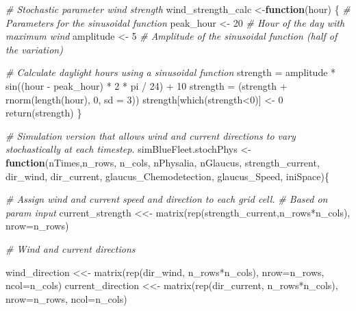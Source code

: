 \documentclass[
]{article}
\newenvironment{Shaded}{\begin{snugshade}}{\end{snugshade}}
\newcommand{\AttributeTok}[1]{\textcolor[rgb]{0.77,0.63,0.00}{#1}}
\newcommand{\CommentTok}[1]{\textcolor[rgb]{0.56,0.35,0.01}{\textit{#1}}}
\newcommand{\ControlFlowTok}[1]{\textcolor[rgb]{0.13,0.29,0.53}{\textbf{#1}}}
\newcommand{\DecValTok}[1]{\textcolor[rgb]{0.00,0.00,0.81}{#1}}
\newcommand{\FunctionTok}[1]{\textcolor[rgb]{0.00,0.00,0.00}{#1}}
\newcommand{\NormalTok}[1]{#1}
\newcommand{\OtherTok}[1]{\textcolor[rgb]{0.56,0.35,0.01}{#1}}
\newcommand{\SpecialCharTok}[1]{\textcolor[rgb]{0.00,0.00,0.00}{#1}}
\begin{document}
\begin{Shaded}
\begin{Highlighting}[]
\CommentTok{\# Stochastic parameter wind strength}
\NormalTok{wind\_strength\_calc }\OtherTok{\textless{}{-}}\ControlFlowTok{function}\NormalTok{(hour) \{}
  \CommentTok{\# Parameters for the sinusoidal function}
\NormalTok{  peak\_hour }\OtherTok{\textless{}{-}} \DecValTok{20}        \CommentTok{\# Hour of the day with maximum wind}
\NormalTok{  amplitude }\OtherTok{\textless{}{-}} \DecValTok{5}       \CommentTok{\# Amplitude of the sinusoidal function (half of the variation)}
  
  
  \CommentTok{\# Calculate daylight hours using a sinusoidal function}
\NormalTok{  strength }\OtherTok{=}\NormalTok{ amplitude }\SpecialCharTok{*} \FunctionTok{sin}\NormalTok{((hour }\SpecialCharTok{{-}}\NormalTok{ peak\_hour) }\SpecialCharTok{*} \DecValTok{2} \SpecialCharTok{*}\NormalTok{ pi }\SpecialCharTok{/} \DecValTok{24}\NormalTok{) }\SpecialCharTok{+} \DecValTok{10} 
\NormalTok{  strength }\OtherTok{=}\NormalTok{ (strength }\SpecialCharTok{+} \FunctionTok{rnorm}\NormalTok{(}\FunctionTok{length}\NormalTok{(hour), }\DecValTok{0}\NormalTok{, }\AttributeTok{sd =} \DecValTok{3}\NormalTok{))}
\NormalTok{  strength[}\FunctionTok{which}\NormalTok{(strength}\SpecialCharTok{\textless{}}\DecValTok{0}\NormalTok{)] }\OtherTok{\textless{}{-}} \DecValTok{0}
  \FunctionTok{return}\NormalTok{(strength)}
\NormalTok{\}}

\CommentTok{\# Simulation version that allows wind and current directions to vary stochastically at each timestep.}
\NormalTok{simBlueFleet.stochPhys }\OtherTok{\textless{}{-}} \ControlFlowTok{function}\NormalTok{(nTimes,n\_rows, n\_cols, nPhysalia, nGlaucus,}
\NormalTok{                                   strength\_current,}
\NormalTok{                                   dir\_wind, dir\_current,}
\NormalTok{                                   glaucus\_Chemodetection, glaucus\_Speed, iniSpace)\{}
  
  \CommentTok{\# Assign wind and current speed and direction to each grid cell.}
  \CommentTok{\# Based on param input}
\NormalTok{  current\_strength }\OtherTok{\textless{}\textless{}{-}} \FunctionTok{matrix}\NormalTok{(}\FunctionTok{rep}\NormalTok{(strength\_current,n\_rows}\SpecialCharTok{*}\NormalTok{n\_cols), }
                              \AttributeTok{nrow=}\NormalTok{n\_rows)}
  
  \CommentTok{\# Wind and current directions}
  
\NormalTok{  wind\_direction }\OtherTok{\textless{}\textless{}{-}} \FunctionTok{matrix}\NormalTok{(}\FunctionTok{rep}\NormalTok{(dir\_wind, n\_rows}\SpecialCharTok{*}\NormalTok{n\_cols), }
                            \AttributeTok{nrow=}\NormalTok{n\_rows, }\AttributeTok{ncol=}\NormalTok{n\_cols)}
\NormalTok{  current\_direction }\OtherTok{\textless{}\textless{}{-}} \FunctionTok{matrix}\NormalTok{(}\FunctionTok{rep}\NormalTok{(dir\_current, n\_rows}\SpecialCharTok{*}\NormalTok{n\_cols), }
                               \AttributeTok{nrow=}\NormalTok{n\_rows, }\AttributeTok{ncol=}\NormalTok{n\_cols)}
  

\end{Highlighting}
\end{Shaded}
\end{document}
